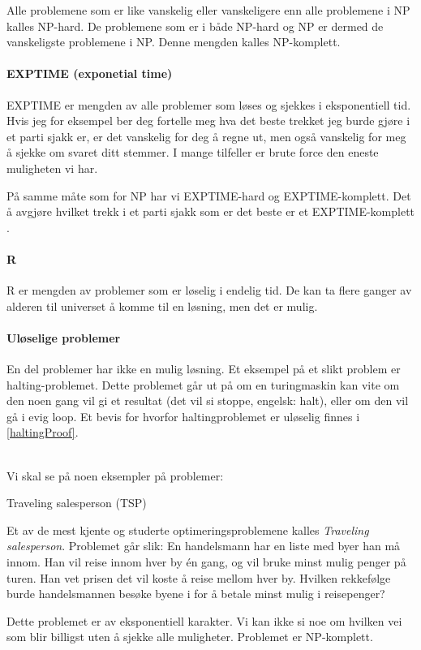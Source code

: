 Alle problemene som er like vanskelig eller vanskeligere enn alle problemene i NP kalles NP-hard. De problemene som er i både NP-hard og NP er dermed de vanskeligste problemene i NP. Denne mengden kalles NP-komplett. 

\paragraph{EXPTIME (exponetial time)}
EXPTIME er mengden av alle problemer som løses og sjekkes i eksponentiell tid. Hvis jeg for eksempel ber deg fortelle meg hva det beste trekket jeg burde gjøre i et parti sjakk er, er det vanskelig for deg å regne ut, men også vanskelig for meg å sjekke om svaret ditt stemmer. I mange tilfeller er brute force den eneste muligheten vi har. 

På samme måte som for NP har vi EXPTIME-hard og EXPTIME-komplett. Det å avgjøre hvilket trekk i et parti sjakk som er det beste er et EXPTIME-komplett . 

\paragraph{R}
R er mengden av problemer som er løselig i endelig tid. De kan ta flere ganger av alderen til universet å komme til en løsning, men det er mulig. 

\paragraph{Uløselige problemer} 
En del problemer har ikke en mulig løsning. Et eksempel på et slikt problem er halting-problemet. Dette problemet går ut på om en turingmaskin kan vite om den noen gang vil gi et resultat (det vil si stoppe, engelsk: halt), eller om den vil gå i evig loop. Et bevis for hvorfor haltingproblemet er uløselig finnes i \ref{haltingProof}. 

~\\
\noindent Vi skal se på noen eksempler på problemer:

\begin{example}
Traveling salesperson (TSP)

Et av de mest kjente og studerte optimeringsproblemene kalles \emph{Traveling salesperson}. Problemet går slik: En handelsmann har en liste med byer han må innom. Han vil reise innom hver by én gang, og vil bruke minst mulig penger på turen. Han vet prisen det vil koste å reise mellom hver by. Hvilken rekkefølge burde handelsmannen besøke byene i for å betale minst mulig i reisepenger?

Dette problemet er av eksponentiell karakter. Vi kan ikke si noe om hvilken vei som blir billigst uten å sjekke alle muligheter. Problemet er NP-komplett.
\end{example}

